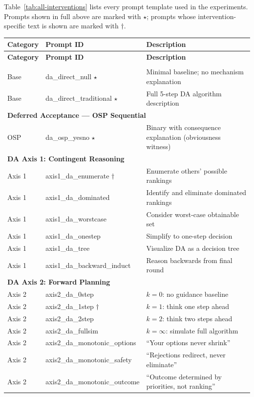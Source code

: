 Table~\ref{tab:all-interventions} lists every prompt template used in the experiments. Prompts shown in full above are marked with $\star$; prompts whose intervention-specific text is shown are marked with $\dagger$.

\begin{longtable}{p{3.2cm} p{4.8cm} p{5.5cm}}
\toprule
\textbf{Category} & \textbf{Prompt ID} & \textbf{Description} \\
\midrule
\endfirsthead
\toprule
\textbf{Category} & \textbf{Prompt ID} & \textbf{Description} \\
\midrule
\endhead
\bottomrule
\endlastfoot

\multicolumn{3}{l}{\textbf{Deferred Acceptance --- Direct Revelation}} \\
\midrule
Base & da\_direct\_null $\star$ & Minimal baseline; no mechanism explanation \\
Base & da\_direct\_traditional $\star$ & Full 5-step DA algorithm description \\
\midrule

\multicolumn{3}{l}{\textbf{Deferred Acceptance --- OSP Sequential \citep{ashlagi2018stable}}} \\
\midrule
OSP & da\_osp\_yesno $\star$ & Binary with consequence explanation (obviousness witness) \\
\midrule

\multicolumn{3}{l}{\textbf{DA Axis 1: Contingent Reasoning}} \\
\midrule
Axis 1 & axis1\_da\_enumerate $\dagger$ & Enumerate others' possible rankings \\
Axis 1 & axis1\_da\_dominated & Identify and eliminate dominated rankings \\
Axis 1 & axis1\_da\_worstcase & Consider worst-case obtainable set \\
Axis 1 & axis1\_da\_onestep & Simplify to one-step decision \\
Axis 1 & axis1\_da\_tree & Visualize DA as a decision tree \\
Axis 1 & axis1\_da\_backward\_induct & Reason backwards from final round \\
\midrule

\multicolumn{3}{l}{\textbf{DA Axis 2: Forward Planning}} \\
\midrule
Axis 2 & axis2\_da\_0step & $k{=}0$: no guidance baseline \\
Axis 2 & axis2\_da\_1step $\dagger$ & $k{=}1$: think one step ahead \\
Axis 2 & axis2\_da\_2step & $k{=}2$: think two steps ahead \\
Axis 2 & axis2\_da\_fullsim & $k{=}\infty$: simulate full algorithm \\
Axis 2 & axis2\_da\_monotonic\_options & ``Your options never shrink'' \\
Axis 2 & axis2\_da\_monotonic\_safety & ``Rejections redirect, never eliminate'' \\
Axis 2 & axis2\_da\_monotonic\_outcome & ``Outcome determined by priorities, not ranking'' \\
\midrule


\end{longtable}

